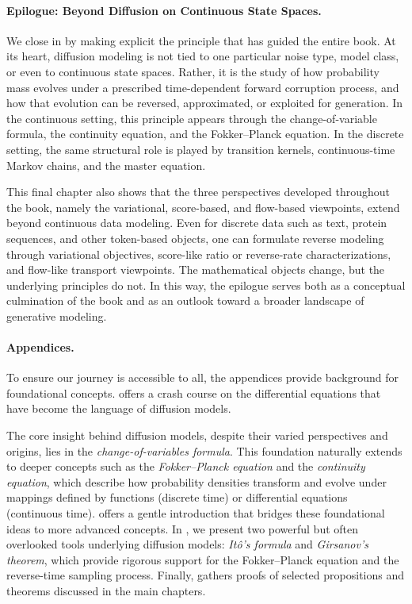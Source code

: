 
\paragraph{Epilogue: Beyond Diffusion on Continuous State Spaces.}
We close in  by making explicit the principle that has guided the entire book. At its heart, diffusion modeling is not tied to one particular noise type, model class, or even to continuous state spaces. Rather, it is the study of how probability mass evolves under a prescribed time-dependent forward corruption process, and how that evolution can be reversed, approximated, or exploited for generation. In the continuous setting, this principle appears through the change-of-variable formula, the continuity equation, and the Fokker--Planck equation. In the discrete setting, the same structural role is played by transition kernels, continuous-time Markov chains, and the master equation.

This final chapter also shows that the three perspectives developed throughout the book, namely the variational, score-based, and flow-based viewpoints, extend beyond continuous data modeling. Even for discrete data such as text, protein sequences, and other token-based objects, one can formulate reverse modeling through variational objectives, score-like ratio or reverse-rate characterizations, and flow-like transport viewpoints. The mathematical objects change, but the underlying principles do not. In this way, the epilogue serves both as a conceptual culmination of the book and as an outlook toward a broader landscape of generative modeling.


\paragraph{Appendices.}
To ensure our journey is accessible to all, the appendices provide background for foundational concepts.  offers a crash course on the differential equations that have become the language of diffusion models. 

The core insight behind diffusion models, despite their varied perspectives and origins, lies in the \emph{change-of-variables formula}. This foundation naturally extends to deeper concepts such as the \emph{Fokker--Planck equation} and the \emph{continuity equation}, which describe how probability densities transform and evolve under mappings defined by functions (discrete time) or differential equations (continuous time). 
 offers a gentle introduction that bridges these foundational ideas to more advanced concepts. 
In , we present two powerful but often overlooked tools underlying diffusion models: \emph{Itô's formula} and \emph{Girsanov's theorem}, which provide rigorous support for the Fokker--Planck equation and the reverse-time sampling process. 
Finally,  gathers proofs of selected propositions and theorems discussed in the main chapters.


